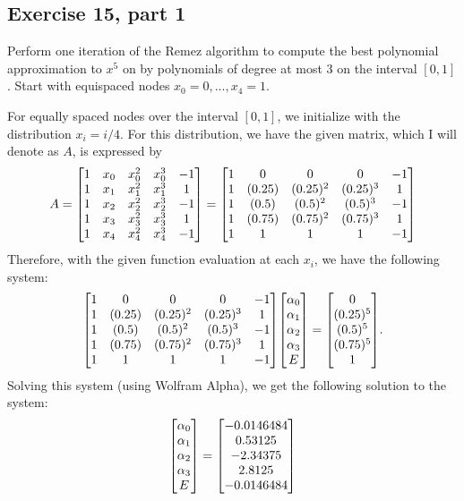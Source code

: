 \subsection{Exercise 15, part 1}
Perform one iteration of the Remez algorithm to compute the best polynomial approximation to $x^5$ on by polynomials of degree at most 3 on the interval $[0, 1]$. Start with equispaced nodes $x_0 = 0, ..., x_4 = 1$. 
\partbreak
\begin{solution}

    For equally spaced nodes over the interval $[0, 1]$, we initialize with the distribution $x_i = i/4$. For this distribution, we have the given matrix, which I will denote as $A$, is expressed by 
    \[A = \mqty[
      1 &x_0&x_0^2&x_0^3&-1\\
      1 &x_1&x_1^2&x_1^3& 1\\
      1 &x_2&x_2^2&x_2^3& -1\\
      1 &x_3&x_3^2&x_3^3& 1\\
      1 &x_4&x_4^2&x_4^3& -1] = 
      \mqty[
      1 &0&0&0&-1\\
      1 &(0.25)&(0.25)^2&(0.25)^3&1\\
      1 &(0.5)&(0.5)^2&(0.5)^3& -1\\
      1 &(0.75)&(0.75)^2&(0.75)^3& 1\\
      1 &1&1&1& -1]  
      \]
      Therefore, with the given function evaluation at each $x_i$, we have the following system:
      \[
      \mqty[
      1 &0&0&0&-1\\
      1 &(0.25)&(0.25)^2&(0.25)^3&1\\
      1 &(0.5)&(0.5)^2&(0.5)^3& -1\\
      1 &(0.75)&(0.75)^2&(0.75)^3& 1\\
      1 &1&1&1& -1]  
      \mqty[
      \alpha_0\\
      \alpha_1\\
      \alpha_2\\
      \alpha_3\\
      E] = 
      \mqty[
      0\\
      (0.25)^5\\
      (0.5)^5\\
      (0.75)^5\\
      1].
      \]
      Solving this system (using Wolfram Alpha), we get the following solution to the system:
      \[\mqty[\alpha_0\\\alpha_1\\\alpha_2\\\alpha_3\\E] = \mqty[-0.0146484\\0.53125\\-2.34375\\2.8125\\-0.0146484]\]

\end{solution}
